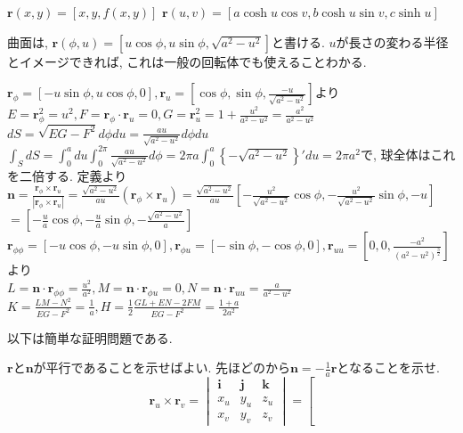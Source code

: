 \documentclass[a4j,dvipdfmx]{jsarticle}
\begin{document}
\begin{qparts}
\begin{qlist}
                \qitem $\bm{r}(x,y)=[x,y,f(x,y)]$
                \qitem $\bm{r}(u,v) = [a\cosh u\cos v,b\cosh u\sin v,c\sinh u]$
            \end{qlist}
            \qpart 曲面は, $\bm{r}(\phi,u)=[u\cos\phi,u\sin\phi,\sqrt{a^2-u^2}]$と書ける. $u$が長さの変わる半径とイメージできれば, これは一般の回転体でも使えることわかる.
            \begin{qlist}
                \qitem $\bm{r}_\phi=[-u\sin\phi,u\cos\phi,0],\bm{r}_u=[\cos\phi,\sin\phi,\frac{-u}{\sqrt{a^2-u^2}}]$より\\
                $E=\bm{r}_\phi^2=u^2,F=\bm{r}_\phi\cdot\bm{r}_u=0,G=\bm{r}_u^2=1+\frac{u^2}{a^2-u^2}=\frac{a^2}{a^2-u^2}$
                \qitem $dS=\sqrt{EG-F^2}d\phi du=\frac{au}{\sqrt{a^2-u^2}}d\phi du$
                \qitem $\int_S dS=\int_0^a du\int_0^{2\pi} \frac{au}{\sqrt{a^2-u^2}}d\phi=2\pi a\int_{0}^{a}\left\{-\sqrt{a^2-u^2}\right\}'du=2\pi a^2$で, 球全体はこれを二倍する.
                \qitem 定義より$\bm{n}=\frac{\bm{r}_\phi\times\bm{r}_u}{|\bm{r}_\phi\times\bm{r}_u|}=\frac{\sqrt{a^2-u^2}}{au}(\bm{r}_\phi\times\bm{r}_u)=\frac{\sqrt{a^2-u^2}}{au}[-\frac{u^2}{\sqrt{a^2-u^2}}\cos\phi,-\frac{u^2}{\sqrt{a^2-u^2}}\sin\phi,-u]$\\
                $=[-\frac{u}{a}\cos\phi,-\frac{u}{a}\sin\phi,-\frac{\sqrt{a^2-u^2}}{a}]$ \label{q:円の法線}
                \qitem $\bm{r}_{\phi\phi}=[-u\cos\phi,-u\sin\phi,0],\bm{r}_{\phi u}=[-\sin\phi,-\cos\phi,0],\bm{r}_{uu}=\left[0,0,\frac{-a^2}{(a^2-u^2)^{\frac{3}{2}}}\right]$より\\
                $L=\bm{n}\cdot\bm{r}_{\phi\phi}=\frac{u^2}{a^2},M=\bm{n}\cdot\bm{r}_{\phi u}=0,N=\bm{n}\cdot\bm{r}_{uu}=\frac{a}{a^2-u^2}$
                \qitem $K=\frac{LM-N^2}{EG-F^2}=\frac{1}{a},H=\frac{1}{2}\frac{GL+EN-2FM}{EG-F^2}=\frac{1+a}{2a^2}$
            \end{qlist}
            \qpart 以下は簡単な証明問題である.
            \begin{qlist}
                \qitem $\bm{r}$と$\bm{n}$が平行であることを示せばよい. 先ほどのから$\bm{n}=-\frac{1}{a}\bm{r}$となることを示せ.
                \qitem 
                \begin{equation*}
                    \bm{r}_u\times\bm{r}_v = \begin{vmatrix}
                        \bm{i} & \bm{j} & \bm{k} \\
                        x_u & y_u & z_u \\
                        x_v & y_v & z_v
                        \end{vmatrix}=\left[

\end{equation*}
\end{qlist}
\end{qparts}
\end{document}
